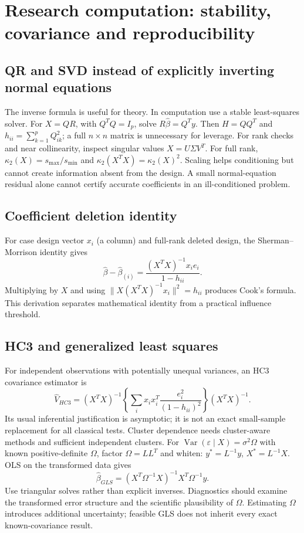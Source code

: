 \documentclass[11pt]{article}
\begin{document}
\section{Research computation: stability, covariance and reproducibility}
\subsection{QR and SVD instead of explicitly inverting normal equations}
The inverse formula is useful for theory. In computation use a stable least-squares solver. For $X=QR$, with $Q^TQ=I_p$, solve $R\widehat\beta=Q^Ty$. Then $H=QQ^T$ and $h_{ii}=\sum_{k=1}^p Q_{ik}^2$; a full $n\times n$ matrix is unnecessary for leverage. For rank checks and near collinearity, inspect singular values $X=U\Sigma V^T$. For full rank, $\kappa_2(X)=s_{\max}/s_{\min}$ and $\kappa_2(X^TX)=\kappa_2(X)^2$. Scaling helps conditioning but cannot create information absent from the design. A small normal-equation residual alone cannot certify accurate coefficients in an ill-conditioned problem.
\subsection{Coefficient deletion identity}
For case design vector $x_i$ (a column) and full-rank deleted design, the Sherman--Morrison identity gives
\[\widehat\beta-\widehat\beta_{(i)}
=\frac{(X^TX)^{-1}x_i e_i}{1-h_{ii}}.\]
Multiplying by $X$ and using $\|X(X^TX)^{-1}x_i\|^2=h_{ii}$ produces Cook's formula. This derivation separates mathematical identity from a practical influence threshold.
\subsection{HC3 and generalized least squares}
For independent observations with potentially unequal variances, an HC3 covariance estimator is
\[\widehat V_{HC3}=(X^TX)^{-1}\left\{\sum_i x_ix_i^T\frac{e_i^2}{(1-h_{ii})^2}\right\}(X^TX)^{-1}.\]
Its usual inferential justification is asymptotic; it is not an exact small-sample replacement for all classical tests. Cluster dependence needs cluster-aware methods and sufficient independent clusters.
For $\operatorname{Var}(\varepsilon\mid X)=\sigma^2\Omega$ with known positive-definite $\Omega$, factor $\Omega=LL^T$ and whiten: $y^*=L^{-1}y$, $X^*=L^{-1}X$. OLS on the transformed data gives
\[\widehat\beta_{GLS}=(X^T\Omega^{-1}X)^{-1}X^T\Omega^{-1}y.\]
Use triangular solves rather than explicit inverses. Diagnostics should examine the transformed error structure and the scientific plausibility of $\Omega$. Estimating $\Omega$ introduces additional uncertainty; feasible GLS does not inherit every exact known-covariance result.
\end{document}
